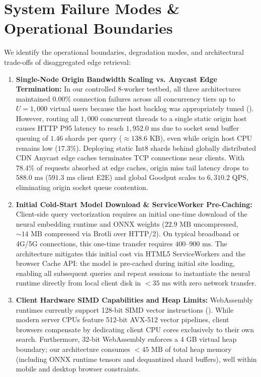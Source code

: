 \documentclass[11pt,journal,compsoc,onecolumn]{IEEEtran}
\begin{document}
\section{System Failure Modes \& Operational Boundaries}
We identify the operational boundaries, degradation modes, and architectural trade-offs of disaggregated edge retrieval:
\begin{enumerate}
    \item \textbf{Single-Node Origin Bandwidth Scaling vs. Anycast Edge Termination:} In our controlled 8-worker testbed, all three architectures maintained $0.00\%$ connection failures across all concurrency tiers up to $U=1,000$ virtual users because the host backlog was appropriately tuned (). However, routing all $1,000$ concurrent threads to a single static origin host causes HTTP P95 latency to reach $1,952.0\text{ ms}$ due to socket send buffer queuing of $1.46$ shards per query ($\approx 138.6\text{ KB}$), even while origin host CPU remains low ($17.3\%$). Deploying static $\text{Int8}$ shards behind globally distributed CDN Anycast edge caches terminates TCP connections near clients. With $78.4\%$ of requests absorbed at edge caches, origin miss tail latency drops to $588.0\text{ ms}$ ($591.3\text{ ms}$ client E2E) and global Goodput scales to $6,310.2\text{ QPS}$, eliminating origin socket queue contention.
    \item \textbf{Initial Cold-Start Model Download \& ServiceWorker Pre-Caching:} Client-side query vectorization requires an initial one-time download of the neural embedding runtime and ONNX weights ($22.9\text{ MB}$ uncompressed, $\sim 14\text{ MB}$ compressed via Brotli over HTTP/2). On typical broadband or 4G/5G connections, this one-time transfer requires $400\text{--}900\text{ ms}$. The architecture mitigates this initial cost via HTML5 ServiceWorkers and the browser Cache API: the model is pre-cached during initial site loading, enabling all subsequent queries and repeat sessions to instantiate the neural runtime directly from local client disk in $<35\text{ ms}$ with zero network transfer.
    \item \textbf{Client Hardware SIMD Capabilities and Heap Limits:} WebAssembly runtimes currently support 128-bit SIMD vector instructions (). While modern server CPUs feature 512-bit AVX-512 vector pipelines, client browsers compensate by dedicating client CPU cores exclusively to their own search. Furthermore, 32-bit WebAssembly enforces a 4 GB virtual heap boundary; our architecture consumes $<45\text{ MB}$ of total heap memory (including ONNX runtime tensors and dequantized shard buffers), well within mobile and desktop browser constraints.

\end{enumerate}
\end{document}
